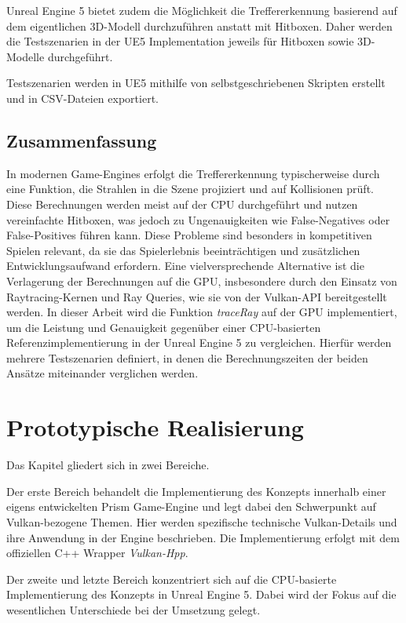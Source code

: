 \documentclass[11pt]{scrartcl}
\begin{document}
{	Unreal Engine 5 bietet zudem die Möglichkeit die Treffererkennung basierend auf dem eigentlichen 3D-Modell durchzuführen anstatt mit Hitboxen. Daher werden die Testszenarien in der UE5 Implementation jeweils für Hitboxen sowie 3D-Modelle durchgeführt.
	
	Testszenarien werden in UE5 mithilfe von selbstgeschriebenen Skripten erstellt und in CSV-Dateien exportiert.
	
	
	\subsection{Zusammenfassung}
	
	In modernen Game-Engines erfolgt die Treffererkennung typischerweise durch eine Funktion, die Strahlen in die Szene projiziert und auf Kollisionen prüft. Diese Berechnungen werden meist auf der CPU durchgeführt und nutzen vereinfachte Hitboxen, was jedoch zu Ungenauigkeiten wie False-Negatives oder False-Positives führen kann. Diese Probleme sind besonders in kompetitiven Spielen relevant, da sie das Spielerlebnis beeinträchtigen und zusätzlichen Entwicklungsaufwand erfordern. Eine vielversprechende Alternative ist die Verlagerung der Berechnungen auf die GPU, insbesondere durch den Einsatz von Raytracing-Kernen und Ray Queries, wie sie von der Vulkan-API bereitgestellt werden. In dieser Arbeit wird die Funktion \textit{traceRay} auf der GPU implementiert, um die Leistung und Genauigkeit gegenüber einer CPU-basierten Referenzimplementierung in der Unreal Engine 5 zu vergleichen. Hierfür werden mehrere Testszenarien definiert, in denen die Berechnungszeiten der beiden Ansätze miteinander verglichen werden.
	
	\pagebreak
	\section{Prototypische Realisierung}
	
	Das Kapitel gliedert sich in zwei Bereiche. 

	Der erste Bereich behandelt die Implementierung des Konzepts innerhalb einer eigens entwickelten Prism Game-Engine und legt dabei den Schwerpunkt auf Vulkan-bezogene Themen. Hier werden spezifische technische Vulkan-Details und ihre Anwendung in der Engine beschrieben. Die Implementierung erfolgt mit dem offiziellen C++ Wrapper \textit{Vulkan-Hpp}\cite{VulkanHpp}.
	
	Der zweite und letzte Bereich konzentriert sich auf die CPU-basierte Implementierung des Konzepts in Unreal Engine 5. Dabei wird der Fokus auf die wesentlichen Unterschiede bei der Umsetzung gelegt.

}
\end{document}
